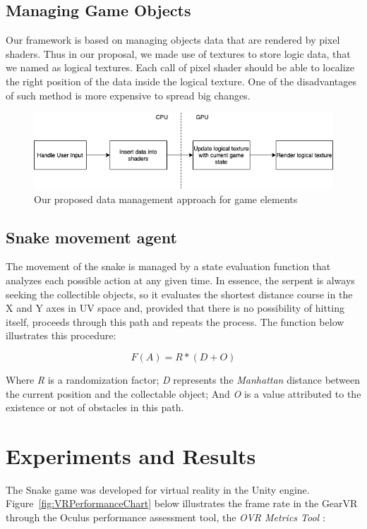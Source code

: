 \documentclass[runningheads]{llncs}
\begin{document}
\subsection{Managing Game Objects}

Our framework is based on managing objects data that are rendered by pixel shaders. Thus in our proposal, we made use of textures to store logic data, that we named as logical textures. Each call of pixel shader should be able to localize the right position of the data inside the logical texture. One of the disadvantages of such method is more expensive to spread big changes.

\begin{figure}[h]
\centering
\includegraphics[width=\textwidth]{hci2020-paper/images/VRSnake_GameObjectData_Management.png}
\caption{Our proposed data management approach for game elements}
\label{fig:VR_GameObjectData_Management}
\end{figure}

\subsection{Snake movement agent} \label{sec:agent}
The movement of the snake is managed by a state evaluation function that analyzes each possible action at any given time. In essence, the serpent is always seeking  the collectible objects, so it evaluates the shortest distance course in the X and Y axes in UV space and, provided that there is no possibility of hitting itself, proceeds through this path and repeats the process. The function below illustrates this procedure:

\begin{equation}
F(A) = R * (D + O)
\label{equation11}
\end{equation}

Where \textit{R} is a randomization factor; \textit{D} represents the \textit{Manhattan} distance between the current position and the collectable object; And \textit{O} is a value attributed to the existence or not of obstacles in this path.

\section{Experiments and Results} \label{sec:results}
The Snake game was developed for virtual reality in the Unity engine. Figure~\ref{fig:VRPerformanceChart}  below illustrates the frame rate in the GearVR through the Oculus performance assessment tool, the \textit{OVR Metrics Tool} \cite{ovrmetrictool}:
\end{document}
